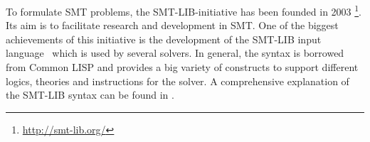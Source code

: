 To formulate SMT problems, the SMT-LIB-initiative has been founded in 2003 \footnote{\url{http://smt-lib.org/}}. 
Its aim is to facilitate research and development in SMT. One of the biggest achievements of this initiative is the development of the SMT-LIB input language~\cite{smt-lib2} which is used by several solvers. In general, the syntax is borrowed from Common LISP and provides a big variety of constructs to support different logics, theories and instructions for the solver. A comprehensive explanation of the SMT-LIB syntax can be found in \cite{smt-lib2}. \\




